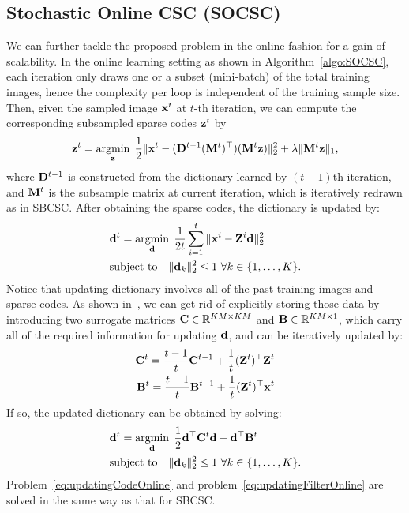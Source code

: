 \subsection{Stochastic Online CSC (SOCSC)}
We can further tackle the proposed problem in the online fashion for a gain of scalability. In the online learning setting as shown in Algorithm~\ref{algo:SOCSC}, each iteration only draws one or a subset (mini-batch) of the total training images, hence the complexity per loop is independent of the training sample size. Then, given the sampled image $\signal^t$ at $t$-th iteration, we can compute the corresponding subsampled sparse codes $\code^t$ by
\begin{equation} \label{eq:updatingCodeOnline}
    \code^t = \minimize{\code} \frac{1}{2}\|\signal^t - (\Filter^{t-1} (\mask^t)^\top)(\mask^t \code) \|_2^2 + \lambda \|\mask^t \code\|_1,
\end{equation}
where $\Filter^{t-1}$ is constructed from the dictionary learned by $(t-1)$th iteration, and $\mask^t$ is the subsample matrix at current iteration, which is iteratively 
redrawn as in SBCSC. After obtaining the sparse codes, the dictionary is updated by:
\begin{equation}
\begin{split}
    &\filter^t = \minimize{\filter} \frac{1}{2t}\sum_{i=1}^{t} \|\signal^i - \Code^i \filter \|_2^2 \\
    &\text{subject to} \quad \|\filter_k\|^2_2 \leq 1 ~ \forall k \in \{1,\dots,K\}.
\end{split}
\end{equation}
Notice that updating dictionary involves all of the past training images and sparse codes. As shown in~\cite{mairal2009online,mairal2010online}, we can get rid of explicitly storing those data by introducing two surrogate matrices $\surC \in \mathbb{R}^{KM \times KM}$ and $\surB \in \mathbb{R}^{KM \times 1}$, which carry all of the required information for updating $\filter$, and can be iteratively updated by:
\begin{equation} \label{eq:updateSur}
\begin{split}
    \surC^t  = \frac{t-1}{t} \surC^{t-1} + \frac{1}{t}(\Code^t)^\top \Code^t \\
    \surB^t  = \frac{t-1}{t} \surB^{t-1} + \frac{1}{t}(\Code^t)^\top \signal^t
\end{split}
\end{equation}
If so, the updated dictionary can be obtained by solving:
\begin{equation} \label{eq:updatingFilterOnline}
\begin{split}
    & \filter^t = \minimize{\filter} \frac{1}{2} \filter^\top \surC^t\filter - \filter^\top \surB^t \\& \text{subject to} \quad \|\filter_k\|_2^2 \leq 1 ~ \forall k \in \{1,\dots,K\}.
\end{split}
\end{equation}
Problem~\ref{eq:updatingCodeOnline} and problem~\ref{eq:updatingFilterOnline} are solved in the same way as that for SBCSC.

